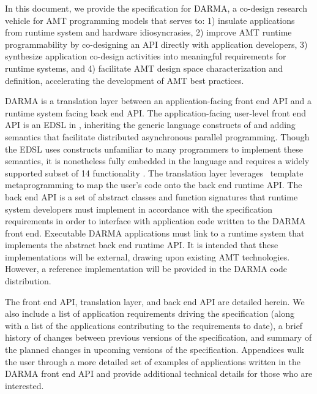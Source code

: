 
In this document, we provide the specification for \gls{DARMA}, 
a co-design research vehicle for \gls{AMT} \glspl{programming model} that 
serves to:
1) insulate applications from \gls{runtime system} and hardware idiosyncrasies,
2) improve \gls{AMT} runtime programmability by co-designing an \gls{API} directly with
  application developers, 3) synthesize application \gls{co-design} activities into
  meaningful requirements for \glspl{runtime system}, and 4) 
facilitate \gls{AMT} design space characterization and definition, accelerating the
development of \gls{AMT} best practices.

\gls{DARMA} is a \gls{translation layer} between an 
application-facing \gls{front end} \gls{API} and a \gls{runtime system} facing \gls{back end} 
\gls{API}.    The application-facing user-level \gls{front end} \gls{API} 
is an \gls{EDSL} in \CC,  inheriting the generic
language constructs of \CC and adding \gls{semantics} that facilitate
distributed asynchronous parallel programming. Though the \gls{EDSL} uses
\CC constructs unfamiliar to many programmers to implement these semantics, 
it is nonetheless fully embedded in the \CC language and
requires a widely supported subset of \CC{}14 functionality \compilerReqs.
The \gls{translation layer} leverages \CC\ \gls{template
metaprogramming} to map the user's code onto the \gls{back end} runtime \gls{API}.
The \gls{back end} \gls{API} is a set of abstract classes and function
signatures that \gls{runtime system} developers must implement in accordance with the
specification requirements in order to interface with application code written
to the \gls{DARMA} front end. Executable \gls{DARMA} applications must link to a \gls{runtime
  system} that implements the abstract \gls{back end} runtime \gls{API}.
It is intended that these implementations will be external, drawing upon
existing \gls{AMT} technologies.  However,  a reference implementation will be provided
in the \gls{DARMA} code distribution.

The \gls{front end} \gls{API}, \gls{translation layer}, and \gls{back end}
\gls{API} are detailed herein. We also
include a list of application requirements driving the specification (along
with a list of the applications contributing to the requirements to date), 
a brief history of changes between previous
versions of the specification, and summary of the planned changes in upcoming
versions of the specification.  Appendices walk the user through a more detailed set
of examples of applications written in the \gls{DARMA} \gls{front end} \gls{API} and provide
additional technical details for those who are interested.

